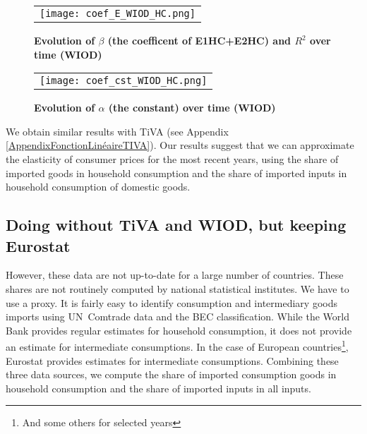 \documentclass[11pt,a4paper]{article}
\begin{document}
\begin{figure}[!h]
\centering
\caption{\footnotesize{\textbf{Evolution of $\beta$ (the coefficent of E1HC+E2HC) and $R^2$ over time (WIOD)}}}
\begin{tabular}{c}
\texttt{[image: coef\_E\_WIOD\_HC.png]}\\
\end{tabular}
\label{fig:evolution_b}
\end{figure}

\begin{figure}[!h]
\centering
\caption{\footnotesize{\textbf{Evolution of $\alpha$ (the constant) over time (WIOD)}}}
\begin{tabular}{c}
\texttt{[image: coef\_cst\_WIOD\_HC.png]}\\
\end{tabular}
\label{fig:evolution_cst}
\end{figure}


We obtain similar results with TiVA (see Appendix \ref{AppendixFonctionLinéaireTIVA}). 
Our results suggest that we can approximate the elasticity of consumer prices for the most recent years, using the share of imported goods in household consumption and the share of imported inputs in household consumption of domestic goods.

\subsection{Doing without TiVA and WIOD, but keeping Eurostat}
However, these data are not up-to-date for a large number of countries. 
These shares are not routinely computed by national statistical institutes. 
We have to use a proxy. It is fairly easy to identify consumption and intermediary goods imports using UN Comtrade data and the BEC classification. 
While the World Bank provides regular estimates for household consumption, it does not provide an estimate for intermediate consumptions. In the case of European countries\footnote{And some others for selected years}, Eurostat provides estimates for intermediate consumptions.%
Combining these three data sources, we compute the share of imported consumption goods in household consumption and the share of imported inputs in all inputs. 
\end{document}
